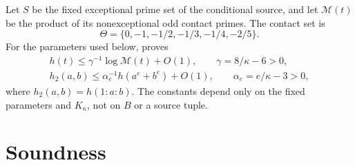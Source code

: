 \documentclass[11pt,a4paper]{article}
\begin{document}
Let \(S\) be the fixed exceptional prime set of the conditional source,
and let \(\mathcal M(t)\) be the product of its nonexceptional odd
contact primes. The contact set is
\[
 \Theta=\{0,-1,-1/2,-1/3,-1/4,-2/5\}.
\]
For the parameters used below, \cite{Conditional} proves
\begin{equation}\label{eq:heights}
 \begin{gathered}
 h(t)\le\gamma^{-1}\log\mathcal M(t)+O(1),
       \qquad \gamma=8/\kappa-6>0,\\
 h_2(a,b)\le\alpha_e^{-1}h(a^e+b^e)+O(1),
       \qquad \alpha_e=e/\kappa-3>0,
 \end{gathered}
\end{equation}
where \(h_2(a,b)=h(1:a:b)\). The constants depend only on the fixed
parameters and \(K_\kappa\), not on \(B\) or a source tuple.

\section{Soundness}
\end{document}
